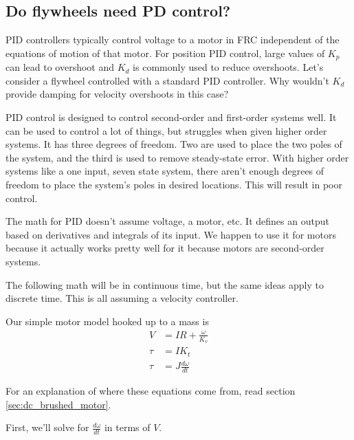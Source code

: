 \subsection{Do flywheels need PD control?}

PID controllers typically control voltage to a motor in FRC independent of the
equations of motion of that motor. For position PID control, large values of
$K_p$ can lead to overshoot and $K_d$ is commonly used to reduce overshoots.
Let's consider a flywheel controlled with a standard PID controller. Why
wouldn't $K_d$ provide damping for velocity overshoots in this case?

PID control is designed to control second-order and first-order \glspl{system}
well. It can be used to control a lot of things, but struggles when given higher
order \glspl{system}. It has three degrees of freedom. Two are used to place the
two poles of the \gls{system}, and the third is used to remove steady-state
error. With higher order \glspl{system} like a one input, seven \gls{state}
\gls{system}, there aren't enough degrees of freedom to place the \gls{system}'s
poles in desired locations. This will result in poor control.

The math for PID doesn't assume voltage, a motor, etc. It defines an output
based on derivatives and integrals of its input. We happen to use it for motors
because it actually works pretty well for it because motors are second-order
\glspl{system}.

The following math will be in continuous time, but the same ideas apply to
discrete time. This is all assuming a velocity controller.

Our simple motor model hooked up to a mass is
\begin{align}
  V &= IR + \frac{\omega}{K_v}
    \label{eq:steady-state_error_classical_flywheel_1} \\
  \tau &= I K_t \label{eq:steady-state_error_classical_flywheel_2} \\
  \tau &= J \frac{d\omega}{dt}
    \label{eq:steady-state_error_classical_flywheel_3}
\end{align}

For an explanation of where these equations come from, read section
\ref{sec:dc_brushed_motor}.

First, we'll solve for $\frac{d\omega}{dt}$ in terms of $V$.

